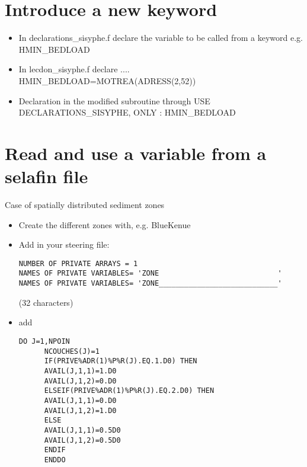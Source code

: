 \section{Introduce a new keyword}
\begin{itemize}
\item In {\ttfamily declarations\_sisyphe.f} declare the variable to be called from a keyword e.g. {\ttfamily HMIN\_BEDLOAD}
\item In {\ttfamily lecdon\_sisyphe.f} declare .... {\ttfamily HMIN\_BEDLOAD=MOTREA(ADRESS(2,52))}
\item Declaration in the modified subroutine through {\ttfamily USE DECLARATIONS\_SISYPHE, ONLY : HMIN\_BEDLOAD}
\end{itemize}


\section{Read and use a variable from a selafin file}
Case of spatially distributed sediment zones

\begin{itemize}
\item Create the different zones with, e.g. BlueKenue
\item Add in your steering file:
  \begin{lstlisting}[frame=trBL]
NUMBER OF PRIVATE ARRAYS = 1
NAMES OF PRIVATE VARIABLES= 'ZONE                            '
NAMES OF PRIVATE VARIABLES= 'ZONE____________________________'
\end{lstlisting}
(32 characters)\textvisiblespace\textvisiblespace\textvisiblespace
\item add
\begin{lstlisting}[frame=trBL]
      DO J=1,NPOIN
      NCOUCHES(J)=1
	  IF(PRIVE%ADR(1)%P%R(J).EQ.1.D0) THEN
	  AVAIL(J,1,1)=1.D0
	  AVAIL(J,1,2)=0.D0
	  ELSEIF(PRIVE%ADR(1)%P%R(J).EQ.2.D0) THEN
	  AVAIL(J,1,1)=0.D0
	  AVAIL(J,1,2)=1.D0	 
	  ELSE 
	  AVAIL(J,1,1)=0.5D0
	  AVAIL(J,1,2)=0.5D0
	  ENDIF
      ENDDO
\end{lstlisting}
\end{itemize}


